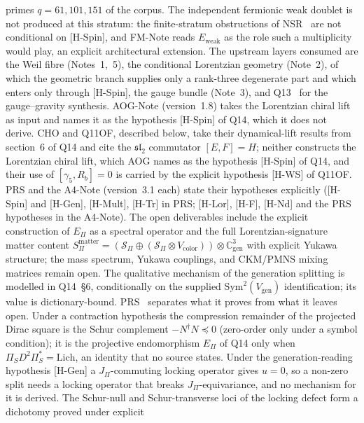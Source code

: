 \documentclass[11pt,a4paper]{article}
\begin{document}
    primes $q = 61, 101, 151$ of the corpus.
    The independent fermionic weak doublet is not produced at this stratum: the finite-stratum obstructions of
    NSR~\cite{Beau2026nsr} are not conditional on [H-Spin], and FM-Note reads $E_{\mathrm{weak}}$ as the role such a
    multiplicity would play, an explicit architectural extension.
    The upstream layers consumed are the Weil fibre (Notes~1,~5), the conditional Lorentzian geometry (Note~2), of
    which the geometric branch supplies only a rank-three degenerate part and which enters only through [H-Spin], the
    gauge bundle (Note~3), and Q13~\cite{Beau2026q13} for the gauge--gravity synthesis.
    AOG-Note (version~1.8) takes the Lorentzian chiral lift as input and names it as the hypothesis [H-Spin] of Q14,
    which it does not derive.
    CHO and Q11OF, described below, take their dynamical-lift results from section~6 of Q14 and cite the
    $\mathfrak{sl}_2$ commutator $[E,F]=H$; neither constructs the Lorentzian chiral lift, which AOG names as the
    hypothesis [H-Spin] of Q14, and their use of $[\gamma_5, R_b] = 0$ is carried by the explicit hypothesis [H-WS]
    of Q11OF.
    PRS and the A4-Note (version~3.1 each) state their hypotheses explicitly ([H-Spin] and [H-Gen], [H-Mult], [H-Tr]
    in PRS; [H-Lor], [H-F], [H-Nd] and the PRS hypotheses in the A4-Note).
    The open deliverables include the explicit construction of $E_\Pi$ as a spectral operator and the full
    Lorentzian-signature matter content
    $S^{\mathrm{matter}}_\Pi = (\mathcal{S}_\Pi \oplus (\mathcal{S}_\Pi \otimes V_{\mathrm{color}})) \otimes
    \mathbb{C}^3_{\mathrm{gen}}$
    with explicit Yukawa structure; the mass spectrum, Yukawa couplings, and CKM/PMNS mixing
    matrices remain open.
    The qualitative mechanism of the generation splitting is modelled in Q14~\S6, conditionally on the
    supplied $\mathrm{Sym}^2(V_{\mathrm{gen}})$ identification; its value is dictionary-bound.
    PRS~\cite{Beau2026prs} separates what it proves from what it leaves open.
    Under a contraction hypothesis the compression remainder of the projected Dirac square is the Schur complement
    $-N^\dagger N \preceq 0$ (zero-order only under a symbol condition); it is the projective endomorphism $E_\Pi$ of Q14 only
    when $\Pi_S D^2 \Pi_S^* = \mathrm{Lich}$, an identity that no source states.
    Under the generation-reading hypothesis [H-Gen] a $J_\Pi$-commuting locking operator gives $u = 0$, so a non-zero
    split needs a locking operator that breaks $J_\Pi$-equivariance, and no mechanism for it is derived.
    The Schur-null and Schur-transverse loci of the locking defect form a dichotomy proved under explicit
\end{document}
